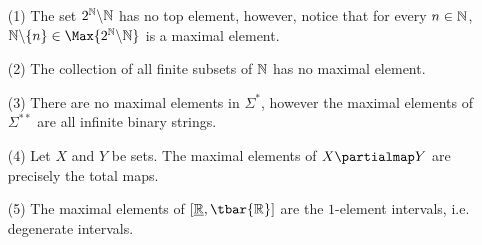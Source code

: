 \begin{example}\label{example_1.10}
  \begin{enumerate}
    \item[(1)] The set $2^{\mathbb{N}} \backslash \mathbb{N}$ has no top element, however,
      notice that for every $n \in \mathbb{N}$, $\com{\N}{\{n\}} \in
      \Max{\com{2^\N}{\N}}$ is a maximal element.

    \item[(2)] The collection of all finite subsets of $\mathbb{N}$ has no
      maximal element.

    \item[(3)] There are no maximal elements in $\Sigma^\ast$, however
      the maximal elements of  $\Sigma^{\ast\ast}$ are all infinite
      binary strings.

    \item[(4)] Let $X$ and $Y$ be sets. The maximal elements of $X
      \partialmap Y$ are precisely the total maps.

    \item[(5)] The maximal elements of $[\bbar{\R},\tbar{\R}]$ are the
      $1$-element intervals, i.e. degenerate intervals.
  \end{enumerate}
\end{example}

